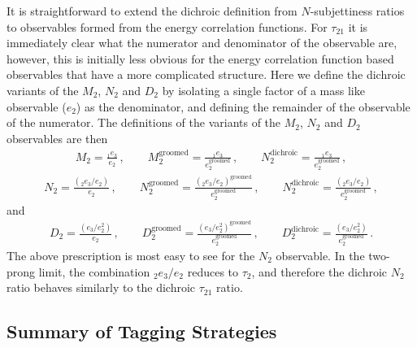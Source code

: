 \documentclass[11pt,letterpaper]{article}
\newcommand{\groomed}{\text{groomed}}
\newcommand{\ecfnobeta}[1]{e_{#1}}
\newcommand{\ecfvarnobeta}[2]{{_{#1}e_{#2}}}
\begin{document}
It is straightforward to extend the dichroic definition from $N$-subjettiness ratios to observables formed from the energy correlation functions.
%
For $\tau_{21}$ it is immediately clear what the numerator and denominator of the observable are, however, this is initially less obvious for the energy correlation function based observables that have a more complicated structure. Here we define the dichroic variants of the $M_2$, $N_2$ and $D_2$ by isolating a single factor of a mass like observable ($e_2$) as the denominator, and defining the remainder of the observable of the numerator.
%
The definitions of the variants of the $M_2$, $N_2$ and $D_2$ observables are then
\begin{align}
M_2= \frac{ \ecfvarnobeta{1}{3}  }{\ecfnobeta{2}}\,, \qquad  M_2^{\text{groomed}}= \frac{ \ecfvarnobeta{1}{3}  }{\ecfnobeta{2}^\groomed}\,, \qquad  N_2^{\text{dichroic}}= \frac{\ecfvarnobeta{1}{3}  }{\ecfnobeta{2}^\groomed}\,, 
\end{align}
\begin{align}
N_2= \frac{\left( \ecfvarnobeta{2}{3} / \ecfnobeta{2} \right) }{\ecfnobeta{2}}\,, \qquad  N_2^{\text{groomed}}= \frac{\left( \ecfvarnobeta{2}{3} / \ecfnobeta{2} \right)^\groomed }{\ecfnobeta{2}^\groomed}\,, \qquad  N_2^{\text{dichroic}}= \frac{\left( \ecfvarnobeta{2}{3} / \ecfnobeta{2} \right) }{\ecfnobeta{2}^\groomed}\,, 
\end{align}
and
\begin{align}
D_2=\frac{\left( \ecfnobeta{3} / \ecfnobeta{2}^2 \right)}{ \ecfnobeta{2}}\,, \qquad D_2^{\text{groomed}}=\frac{\left( \ecfnobeta{3} / \ecfnobeta{2}^2 \right)^\groomed}{ \ecfnobeta{2}^\groomed}\,, \qquad D_2^{\text{dichroic}}=\frac{\left( \ecfnobeta{3} / \ecfnobeta{2}^2 \right)}{ \ecfnobeta{2}^\groomed}\,.
\end{align}
The above prescription is most easy to see for the $N_2$ observable. In the two-prong limit, the combination $ \ecfvarnobeta{2}{3} / \ecfnobeta{2} $ reduces to $\tau_2$, and therefore the dichroic $N_2$ ratio behaves similarly to the dichroic $\tau_{21}$ ratio.

\subsection{Summary of Tagging Strategies}\label{sec:dichroic_sum}
\end{document}
